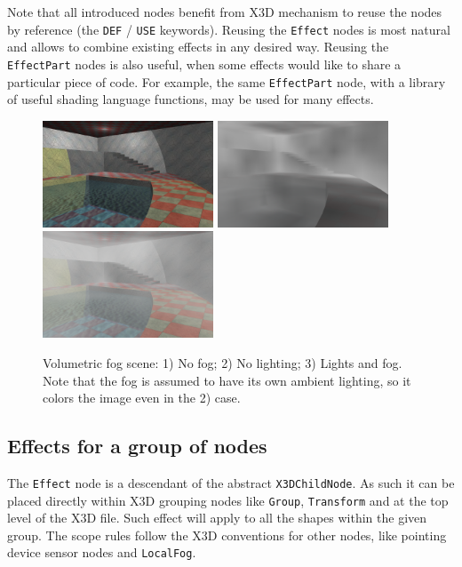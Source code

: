 \documentclass{egpubl}
\begin{document}
Note that all introduced nodes benefit from X3D mechanism to reuse the nodes
by reference (the \texttt{DEF} / \texttt{USE} keywords). Reusing the
\texttt{Effect} nodes
is most natural and allows to combine existing effects in any desired way.
Reusing the \texttt{EffectPart} nodes is also useful, when some effects
would like to share a particular piece of code. For example,
the same \texttt{EffectPart} node, with a library of useful
shading language functions, may be used for many effects.

\begin{figure}[t]
  \centering
  \includegraphics[width=2.0in]{volumetric_animated_fog_no_fog}
  \includegraphics[width=2.0in]{volumetric_animated_fog_no_light}
  \includegraphics[width=2.0in]{volumetric_animated_fog_all}
  \caption{Volumetric fog scene: 1) No fog; 2) No lighting; 3) Lights and fog.
Note that the fog is assumed to have its own ambient lighting,
so it colors the image even in the 2) case.}
  \label{fig_fog}
\end{figure}

\subsection{Effects for a group of nodes}

The \texttt{Effect} node is a descendant of the abstract \texttt{X3DChildNode}.
As such it can be placed directly within X3D grouping nodes like
\texttt{Group}, \texttt{Transform} and at the top level of the X3D file.
Such effect will apply to all the shapes within the given group.
The scope rules follow the X3D conventions for other nodes,
like pointing device sensor nodes and \texttt{LocalFog}.
\end{document}
